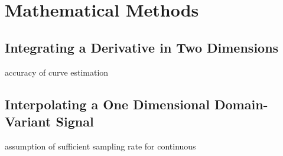 \documentclass{report}
\begin{document}
\chapter{Mathematical Methods}
\section{Integrating a Derivative in Two Dimensions}
accuracy of curve estimation
\section{Interpolating a One Dimensional Domain-Variant Signal}
assumption of sufficient sampling rate for continuous

\iffalse
\printbibliography
\fi
{}

\end{document}
